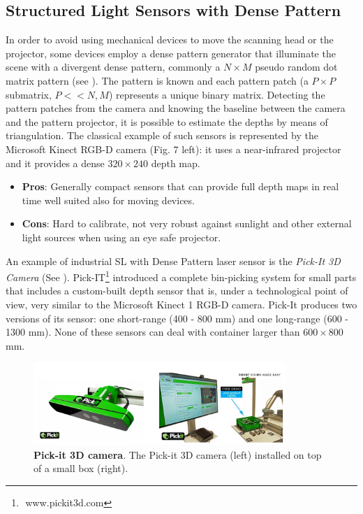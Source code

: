 \subsection{Structured Light Sensors with Dense Pattern}\label{subsec:sl_sensors_dp}
In order to avoid using mechanical devices to move the scanning head or the projector, some devices employ a dense pattern generator that illuminate the scene with a divergent dense pattern, commonly a $N \times M$ pseudo random dot matrix pattern (see ). The pattern is known and each pattern patch (a $P \times P$ submatrix, $P << N, M$) represents a unique binary matrix. Detecting the pattern patches from the camera and knowing the baseline between the camera and the pattern projector, it is possible to estimate the depths by means of triangulation. The classical example of such sensors is represented by the Microsoft Kinect RGB-D camera (Fig. 7 left): it uses a near-infrared projector and it provides a dense $320 \times 240$ depth map.

\begin{itemize}
	\item \textbf{Pros}: Generally compact sensors that can provide full depth maps in real time well suited also for moving devices.
	\item \textbf{Cons}: Hard to calibrate, not very robust against sunlight and other external light sources when using an eye safe projector.
\end{itemize}

An example of industrial SL with Dense Pattern laser sensor is the \emph{Pick-It 3D Camera} (See ). Pick-IT\footnote{​ www.pickit3d.com} introduced a complete bin-picking system for small parts that includes a custom-built depth sensor  that is, under a technological point of view, very similar to the Microsoft Kinect 1 RGB-D camera. Pick-It produces two versions of its sensor: one short-range (400 - 800 mm) and one long-range (600 - 1300 mm). None of these sensors can deal with container larger than $600 \times 800$ mm.

\begin{figure}
    \centering
    \includegraphics[width=0.85\textwidth]{figures/1_perception_and_sensing_in_robotics/pick_it_3d}
    \caption{\textbf{Pick-it 3D camera}. The Pick-it 3D camera (left) installed on top of a small box (right).} 
    \label{fig:pick_it_3d}
\end{figure}

